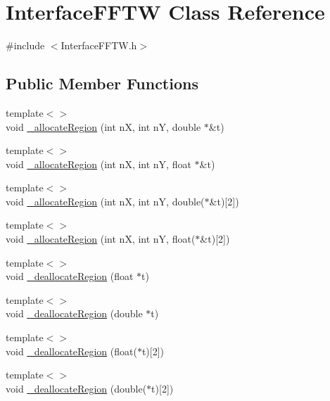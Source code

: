 \hypertarget{class_interface_f_f_t_w}{}\section{Interface\+F\+F\+T\+W Class Reference}
\label{class_interface_f_f_t_w}


{\ttfamily \#include $<$Interface\+F\+F\+T\+W.\+h$>$}

\subsection*{Public Member Functions}
\begin{DoxyCompactItemize}
\item 
{\footnotesize template$<$$>$ }\\void \hyperlink{class_interface_f_f_t_w_a89d340aba6fcaef5f9a50b106970192d}{\+\_\+allocate\+Region} (int n\+X, int n\+Y, double $\ast$\&t)
\item 
{\footnotesize template$<$$>$ }\\void \hyperlink{class_interface_f_f_t_w_a2433f0af2a6e14b35b998e90c25d7d85}{\+\_\+allocate\+Region} (int n\+X, int n\+Y, float $\ast$\&t)
\item 
{\footnotesize template$<$$>$ }\\void \hyperlink{class_interface_f_f_t_w_a5a6de494f17509cefb39883070592850}{\+\_\+allocate\+Region} (int n\+X, int n\+Y, double($\ast$\&t)\mbox{[}2\mbox{]})
\item 
{\footnotesize template$<$$>$ }\\void \hyperlink{class_interface_f_f_t_w_a0dfcb16dd95359fe2303f8a8a54f2259}{\+\_\+allocate\+Region} (int n\+X, int n\+Y, float($\ast$\&t)\mbox{[}2\mbox{]})
\item 
{\footnotesize template$<$$>$ }\\void \hyperlink{class_interface_f_f_t_w_ac5a59260adf072482e2230d97a438555}{\+\_\+deallocate\+Region} (float $\ast$t)
\item 
{\footnotesize template$<$$>$ }\\void \hyperlink{class_interface_f_f_t_w_a8df6e111ef75919697422e471d59cbab}{\+\_\+deallocate\+Region} (double $\ast$t)
\item 
{\footnotesize template$<$$>$ }\\void \hyperlink{class_interface_f_f_t_w_a779ecab958e3cabfcc3bc21d6cd0164d}{\+\_\+deallocate\+Region} (float($\ast$t)\mbox{[}2\mbox{]})
\item 
{\footnotesize template$<$$>$ }\\void \hyperlink{class_interface_f_f_t_w_aef606f9df4caa5e1a0532de1460ba8f8}{\+\_\+deallocate\+Region} (double($\ast$t)\mbox{[}2\mbox{]})
\end{DoxyCompactItemize}
